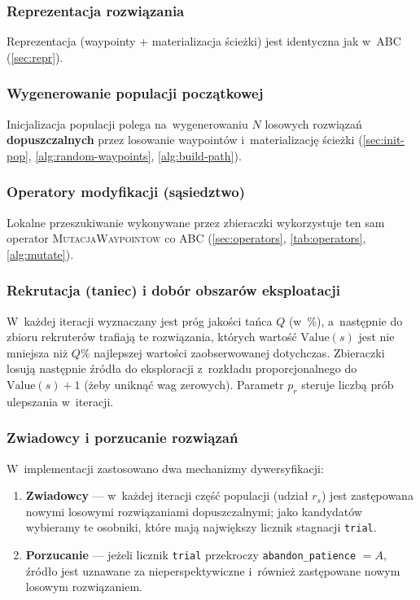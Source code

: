 \subsubsection{Reprezentacja rozwiązania}

Reprezentacja (waypointy + materializacja ścieżki) jest identyczna jak w~ABC
(\cref{sec:repr}).

\subsubsection{Wygenerowanie populacji początkowej}

Inicjalizacja populacji polega na~wygenerowaniu $N$ losowych rozwiązań
\textbf{dopuszczalnych} przez losowanie waypointów i~materializację ścieżki
(\cref{sec:init-pop}, \cref{alg:random-waypoints}, \cref{alg:build-path}).

\subsubsection{Operatory modyfikacji (sąsiedztwo)}

Lokalne przeszukiwanie wykonywane przez zbieraczki wykorzystuje ten sam operator
\textsc{MutacjaWaypointow} co ABC (\cref{sec:operators}, \cref{tab:operators},
\cref{alg:mutate}).

\subsubsection{Rekrutacja (taniec) i dobór obszarów eksploatacji}

W~każdej iteracji wyznaczany jest próg jakości tańca $Q$ (w~\%), a~następnie do
zbioru rekruterów trafiają te rozwiązania, których wartość
$\mathrm{Value}(s)$ jest nie mniejsza niż $Q\%$ najlepszej wartości
zaobserwowanej dotychczas. Zbieraczki losują następnie źródła do eksploracji
z~rozkładu proporcjonalnego do $\mathrm{Value}(s)+1$ (żeby uniknąć wag zerowych).
Parametr $p_r$ steruje liczbą prób ulepszania w~iteracji.

\subsubsection{Zwiadowcy i porzucanie rozwiązań}

W~implementacji zastosowano dwa mechanizmy dywersyfikacji:
\begin{enumerate}
    \item \textbf{Zwiadowcy} --- w~każdej iteracji część populacji (udział $r_s$)
          jest zastępowana nowymi losowymi rozwiązaniami dopuszczalnymi; jako
          kandydatów wybieramy te osobniki, które mają największy licznik
          stagnacji \texttt{trial}.
    \item \textbf{Porzucanie} --- jeżeli licznik \texttt{trial} przekroczy
          \texttt{abandon\_patience} $=A$, źródło jest uznawane za nieperspektywiczne
          i~również zastępowane nowym losowym rozwiązaniem.
\end{enumerate}

